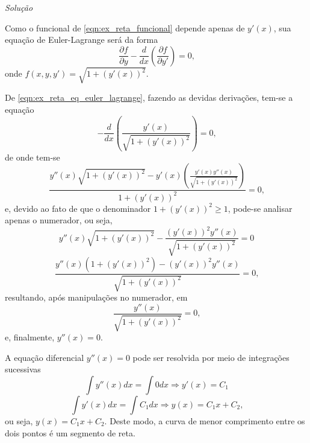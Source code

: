 \documentclass[
	12pt,				%
	openright,			%
    twoside,			%
	a4paper,			%
	chapter=TITLE,		%
	english,			%
	french,				%
	spanish,			%
	brazil				%
	]{abntex2}
\makeatletter
\renewenvironment{proof}[1][\proofname]{
	\par\pushQED{\qed}%
	\normalfont \topsep6\p@\@plus6\p@\relax
	\trivlist
	\item\relax
		{\itshape
			#1\@addpunct{.}}\hspace\labelsep\ignorespaces
}{%
	\popQED\endtrivlist\@endpefalse
}
\newenvironment{solution}{
	\begin{proof}[Solução]
}{%
	\end{proof}
}
\numberwithin{lema}{chapter}
\numberwithin{teorema}{chapter}
\numberwithin{definicao}{chapter}
\numberwithin{exemplo}{chapter}
\numberwithin{figure}{chapter}
\makeatother
\begin{document}
\begin{solution}
	Como o funcional de \eqref{eqn:ex_reta_funcional} depende apenas de $y'(x)$, sua equação de Euler-Lagrange será da forma
	\begin{equation}
		\label{eqn:ex_reta_eq_euler_lagrange}
		\frac{\partial f}{\partial y}
		-
		\frac{d}{dx} \left (
			\frac{\partial f}{\partial y'}
		\right )
		= 0
		\text{,}
	\end{equation}
	onde $f(x, y, y')=\sqrt{1+(y'(x))^2}$.
	
	De \eqref{eqn:ex_reta_eq_euler_lagrange}, fazendo as devidas derivações, tem-se a equação
	\begin{equation}
		\label{eqn:ex_reta_prim_deriv}
		-\frac{d}{dx} \left (
			\frac{y'(x)}{\sqrt{1+(y'(x))^2}}
		\right )
		= 0
		\text{,}
	\end{equation}
	de onde tem-se
	$$
		\frac{
			y''(x)\sqrt{1+(y'(x))^2}
			-
			y'(x)\left (
				\frac{y'(x)y''(x)}{\sqrt{1+(y'(x))^2}}
			\right )
		}{
			1+(y'(x))^2
		}
		=0\text{,}
	$$
	e, devido ao fato de que o denominador $1+(y'(x))^2\geqslant 1$, pode-se analisar apenas o numerador, ou seja,
	$$
		y''(x)\sqrt{1+(y'(x))^2}
		-
		\frac{(y'(x))^2 y''(x)}{
			\sqrt{1+(y'(x))^2}
		}
		= 0
	$$
	$$
		\frac{
			y''(x)(1+(y'(x))^2)-(y'(x))^2y''(x)
		}{
			\sqrt{1+(y'(x))^2}
		}
		= 0
		\text{,}
	$$
	resultando, após manipulações no numerador, em
	$$
		\frac{y''(x)}{
			\sqrt{1+(y'(x))^2}
		}
		= 0
		\text{,}
	$$
	e, finalmente, $y''(x)=0$.
	
	A equação diferencial $y''(x)=0$ pode ser resolvida por meio de integrações sucessivas
	$$
		\int y''(x)dx = \int 0 dx \Longrightarrow y'(x) = C_1
	$$
	$$
		\int y'(x)dx = \int C_1 dx \Longrightarrow y(x) = C_1 x + C_2
		\text{,}
	$$
	ou seja, $y(x)=C_1x+C_2$. Deste modo, a curva de menor comprimento entre os dois pontos é um segmento de reta.
\end{solution}
\end{document}
